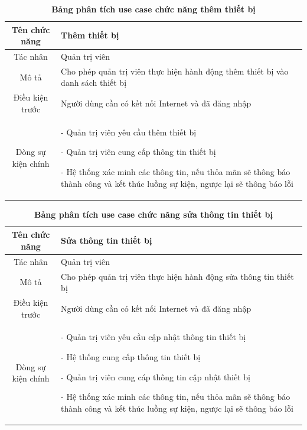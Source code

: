   \begin{table}[H]
    \caption{\bfseries \fontsize{12pt}{0pt}\selectfont Bảng phân tích use case chức năng thêm thiết bị}
    \centering
    \begin{tabularx}{0.9\textwidth}{|c|X|}
      \hline
      \textbf{Tên chức năng} & \textbf{Thêm thiết bị} \\
      \hline
      Tác nhân & Quản trị viên \\
      \hline
      Mô tả & Cho phép quản trị viên thực hiện hành động thêm thiết bị vào danh sách thiết bị\\
      \hline
      Điều kiện trước & Người dùng cần có kết nối Internet và đã đăng nhập \\
      \hline
      Dòng sự kiện chính & 
        - Quản trị viên yêu cầu thêm thiết bị

        - Quản trị viên cung cấp thông tin thiết bị

        - Hệ thống xác minh các thông tin, nếu thỏa mãn sẽ thông báo thành công và kết thúc luồng sự kiện, ngược lại 
        sẽ thông báo lỗi           
        \\
      \hline
    \end{tabularx}
  \end{table}

  \begin{table}[H]
    \caption{\bfseries \fontsize{12pt}{0pt}\selectfont Bảng phân tích use case chức năng sửa thông tin thiết bị}
    \centering
    \begin{tabularx}{0.9\textwidth}{|c|X|}
      \hline
      \textbf{Tên chức năng} & \textbf{Sửa thông tin thiết bị} \\
      \hline
      Tác nhân & Quản trị viên \\
      \hline
      Mô tả & Cho phép quản trị viên thực hiện hành động sửa thông tin thiết bị \\
      \hline
      Điều kiện trước & Người dùng cần có kết nối Internet và đã đăng nhập \\
      \hline
      Dòng sự kiện chính & 
        - Quản trị viên yêu cầu cập nhật thông tin thiết bị

        - Hệ thống cung cấp thông tin thiết bị

        - Quản trị viên cung cáp thông tin cập nhật thiết bị

        - Hệ thống xác minh các thông tin, nếu thỏa mãn sẽ thông báo thành công và kết thúc luồng sự kiện, ngược lại 
        sẽ thông báo lỗi           
        \\
      \hline
    \end{tabularx}
  \end{table}

